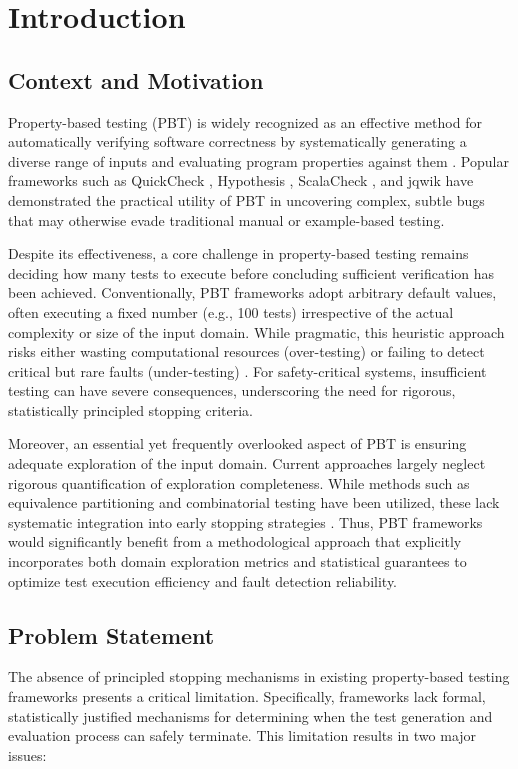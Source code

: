 \section{Introduction}

\subsection{Context and Motivation}
Property-based testing (PBT) is widely recognized as an effective method for automatically verifying software correctness by systematically generating a diverse range of inputs and evaluating program properties against them \cite{Pacheco2007, Arcuri2011}. Popular frameworks such as QuickCheck \cite{Hughes2007}, Hypothesis \cite{MacIver2019}, ScalaCheck \cite{Nilsson2014}, and jqwik \cite{Link2020} have demonstrated the practical utility of PBT in uncovering complex, subtle bugs that may otherwise evade traditional manual or example-based testing.

Despite its effectiveness, a core challenge in property-based testing remains deciding how many tests to execute before concluding sufficient verification has been achieved. Conventionally, PBT frameworks adopt arbitrary default values, often executing a fixed number (e.g., 100 tests) irrespective of the actual complexity or size of the input domain. While pragmatic, this heuristic approach risks either wasting computational resources (over-testing) or failing to detect critical but rare faults (under-testing) \cite{Fraser2012, Groce2013}. For safety-critical systems, insufficient testing can have severe consequences, underscoring the need for rigorous, statistically principled stopping criteria.

Moreover, an essential yet frequently overlooked aspect of PBT is ensuring adequate exploration of the input domain. Current approaches largely neglect rigorous quantification of exploration completeness. While methods such as equivalence partitioning and combinatorial testing have been utilized, these lack systematic integration into early stopping strategies \cite{Hamlet1990, Kuhn2013}. Thus, PBT frameworks would significantly benefit from a methodological approach that explicitly incorporates both domain exploration metrics and statistical guarantees to optimize test execution efficiency and fault detection reliability.

\subsection{Problem Statement}
The absence of principled stopping mechanisms in existing property-based testing frameworks presents a critical limitation. Specifically, frameworks lack formal, statistically justified mechanisms for determining when the test generation and evaluation process can safely terminate. This limitation results in two major issues:

